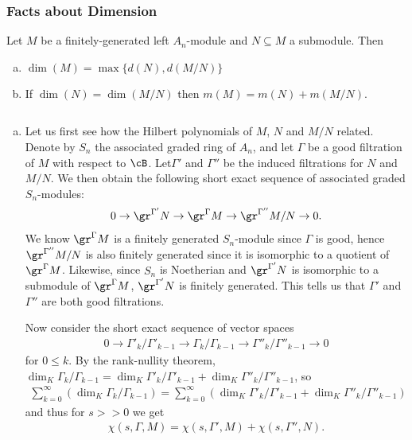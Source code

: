 \subsubsection{Facts about Dimension}
\begin{thm}\label{thm:basic-dim-properties-A_n}
	Let $M$ be a finitely-generated left $A_n$-module and $N \subseteq M$ a submodule. Then
	\begin{enumerate}[(a)]
		\item $\dim(M) = \max\{d(N),d(M/N)\}$ 
		\item If $\dim(N) = \dim(M/N)$ then $m(M) = m(N) + m(M/N)$.
	\end{enumerate}
\end{thm}
\begin{prf}$ $
	\begin{enumerate}[(a)]
		\item Let us first see how the Hilbert polynomials of $M$, $N$ and $M/N$ related. Denote by $S_n$ the associated graded ring of $A_n$, and let $\Gamma$ be a good filtration of $M$ with respect to $\cB$. Let$\Gamma'$ and $\Gamma''$ be the induced filtrations for $N$ and $M/N$. We then obtain the following short exact sequence of associated graded $S_n$-modules:
		\begin{align*}
			0 \to \gr^{\Gamma'}N \to \gr^\Gamma M \to \gr^{\Gamma''}M/N \to 0.
		\end{align*}
		We know $\gr^\Gamma M$ is a finitely generated $S_n$-module since $\Gamma$ is good, hence $\gr^{\Gamma''}M/N$ is also finitely generated since it is isomorphic to a quotient of $\gr^\Gamma M$. Likewise, since $S_n$ is Noetherian and $\gr^{\Gamma'}N$ is isomorphic to a submodule of $\gr^\Gamma M$, $\gr^{\Gamma'}N$ is finitely generated. This tells us that $\Gamma'$ and $\Gamma''$ are both good filtrations.

		Now consider the short exact sequence of vector spaces
		\begin{align*}
			0 \to \Gamma'_k/\Gamma'_{k-1} \to \Gamma_k/\Gamma_{k-1} \to \Gamma''_{k}/\Gamma''_{k-1}\to 0
		\end{align*}
		for $0\leq k$. By the rank-nullity theorem, $\dim_K\Gamma_k/\Gamma_{k-1} = \dim_K\Gamma'_k/\Gamma'_{k-1} + \dim_K\Gamma''_{k}/\Gamma''_{k-1}$, so 
		\begin{align*}
			\sum_{k=0}^\infty\left(\dim_K\Gamma_k/\Gamma_{k-1}\right) = \sum_{k = 0}^\infty\left(\dim_K\Gamma'_k/\Gamma'_{k-1} + \dim_K\Gamma''_{k}/\Gamma''_{k-1}\right)
		\end{align*}
		and thus for $s >> 0$ we get
		\begin{align*}
			\chi(s,\Gamma,M) = \chi(s,\Gamma',M) + \chi(s,\Gamma'', N).
		\end{align*}


\end{enumerate}
\end{prf}
